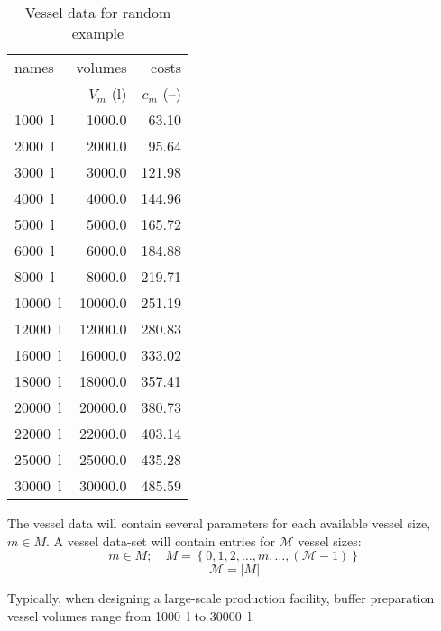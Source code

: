 \begin{table}[h!]
    \centering
    \caption{Vessel data for random example}
    \label{tbl.vessel}
    \begin{tabular}{l | r | r}
        names & volumes & costs\\
        & $V_{m}$ (l) & $c_{m}$ (--)\\\hline
        \SI{1000}{\litre} & \SI{1000.0}{} & \SI{63.10}{}\\
        \SI{2000}{\litre} & \SI{2000.0}{} & \SI{95.64}{}\\
        \SI{3000}{\litre} & \SI{3000.0}{} & \SI{121.98}{}\\
        \SI{4000}{\litre} & \SI{4000.0}{} & \SI{144.96}{}\\
        \SI{5000}{\litre} & \SI{5000.0}{} & \SI{165.72}{}\\
        \SI{6000}{\litre} & \SI{6000.0}{} & \SI{184.88}{}\\
        \SI{8000}{\litre} & \SI{8000.0}{} & \SI{219.71}{}\\
        \SI{10000}{\litre} & \SI{10000.0}{} & \SI{251.19}{}\\
        \SI{12000}{\litre} & \SI{12000.0}{} & \SI{280.83}{}\\
        \SI{16000}{\litre} & \SI{16000.0}{} & \SI{333.02}{}\\
        \SI{18000}{\litre} & \SI{18000.0}{} & \SI{357.41}{}\\
        \SI{20000}{\litre} & \SI{20000.0}{} & \SI{380.73}{}\\
        \SI{22000}{\litre} & \SI{22000.0}{} & \SI{403.14}{}\\
        \SI{25000}{\litre} & \SI{25000.0}{} & \SI{435.28}{}\\
        \SI{30000}{\litre} & \SI{30000.0}{} & \SI{485.59}{}\\
    \end{tabular}
\end{table}

The vessel data will contain several parameters for each available vessel size,
$m \in M$.
A vessel data-set will contain entries for $\mathcal{M}$ vessel sizes:
\begin{equation}
    m \in M; \quad M = \left\{ 0, 1, 2, \ldots, m, \ldots, \left(
    \mathcal{M} - 1 \right) \right\}
\end{equation}
\begin{equation}
    \mathcal{M} = |M|
\end{equation}

Typically, when designing a large-scale production facility, buffer preparation
vessel volumes range from \SI{1000}{\litre} to \SI{30000}{\litre}.

